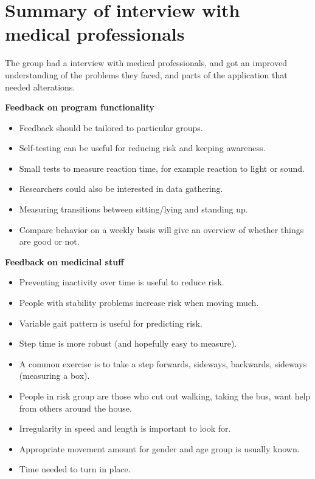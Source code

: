 \section{Summary of interview with medical professionals}
The group had a interview with medical professionals, and got an improved understanding of the problems they faced, and parts of the application that needed alterations.

\textbf{Feedback on program functionality}
\begin{itemize}
\item Feedback should be tailored to particular groups.
\item Self-testing can be useful for reducing risk and keeping awareness.
\item Small tests to measure reaction time, for example reaction to light or sound.
\item Researchers could also be interested in data gathering.
\item Measuring transitions between sitting/lying and standing up.
\item Compare behavior on a weekly basis will give an overview of whether things are good or not.
\end{itemize}

\textbf{Feedback on medicinal stuff}
\begin{itemize}
\item Preventing inactivity over time is useful to reduce risk.
\item People with stability problems increase risk when moving much.
\item Variable gait pattern is useful for predicting risk.
\item Step time is more robust (and hopefully easy to measure).
\item A common exercise is to take a step forwards, sideways, backwards, sideways (measuring a box).
\item People in risk group are those who cut out walking, taking the bus, want help from others around the house.
\item Irregularity in speed and length is important to look for.
\item Appropriate movement amount for gender and age group is usually known.
\item Time needed to turn in place.
\end{itemize}

